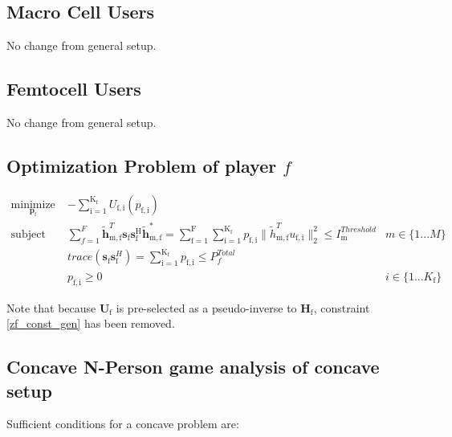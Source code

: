 \documentclass[12pt,a4paper]{report}
\begin{document}
\subsection{Macro Cell Users}
No change from general setup.

\subsection{Femtocell Users}
No change from general setup.



\subsection{Optimization Problem of player $f$}\label{conproblem}


	\begin{subequations}
	\label{optim}
	\begin{align}
	    \underset{\mathbf{p}_{\mathrm{f}} }{\text{minimize}} \;
	    & - \sum_{\mathrm{i=1}}^{\mathrm{K_f}}
    	U_{\mathrm{f,i}}(p_{\mathrm{f,i}}) \label{player_opt_c} \\
	    \text{subject to} \; &
	  \sum^F_{f=1} \mathbf{\tilde{h}}_{\mathrm{m,f}}^T  \mathbf{s}_{\mathrm{f}} 						
	\mathbf{s_{\mathrm{f}}^{\mathrm{H}}} \mathbf{\tilde{h}_{\mathrm{m,f}}^*} 
	=
	\sum_{\mathrm{f=1}}^{\mathrm{F}}	\sum_{\mathrm{i=1}}^{\mathrm{K_f}}
	p_{\mathrm{f,i}}\|\tilde{h}_{\mathrm{m,f}}^T u_{\mathrm{f,i}}\|^2_2
	\leq I^{Threshold}		
	_{\mathrm{m}} & m \in \{1 ...M\} 
		\label{interference_const_c}\\
        & trace(\mathbf{s}_\mathrm{f}\mathbf{s}_\mathrm{f}^H) =
        	\sum_{\mathrm{i=1}}^{\mathrm{K_{\mathrm{f}}}} p_{\mathrm{f,i}}
	   \leq P^{Total}_{f}  \label{power_const_c}\\
        & p_{\mathrm{f,i}} \geq 0 &  i \in \{1 ...K_{\mathrm{f}}\} \label{pos_power_const_c}
	\end{align}
	\end{subequations}

Note that because $\mathbf{U}_{\mathrm{f}}$ is pre-selected as a pseudo-inverse to  $\mathbf{H_\mathrm{f}}$, constraint \eqref{zf_const_gen} has been removed.

\subsection{Concave N-Person game analysis of concave setup}

Sufficient conditions for a concave problem are:
\end{document}
